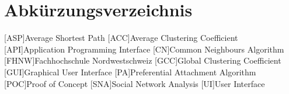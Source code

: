 \chapter*{Abkürzungsverzeichnis}

\begin{acronym}[nonumberlist]
    [ASP]{Average Shortest Path}
    [ACC]{Average Clustering Coefficient}
    [API]{Application Programming Interface}
    [CN]{Common Neighbours Algorithm}
    [FHNW]{Fachhochschule Nordwestschweiz}
    [GCC]{Global Clustering Coefficient}
    [GUI]{Graphical User Interface}
    [PA]{Preferential Attachment Algorithm}
    [POC]{Proof of Concept}
    [SNA]{Social Network Analysis}
    [UI]{User Interface}
\end{acronym}
